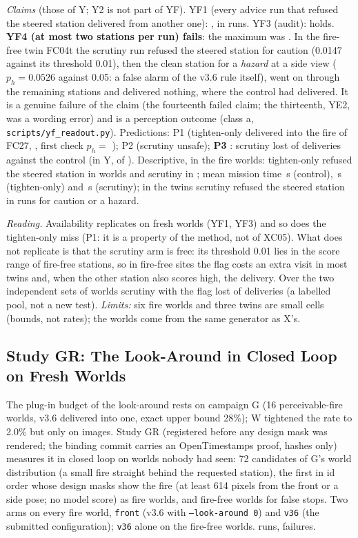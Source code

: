 \documentclass[conference]{IEEEtran}
\begin{document}
\emph{Claims} (those of Y; Y2 is not part of YF). YF1 (every advice run that refused the steered station delivered from another one): \YFOneHolds{}, in \YFOneRefused{} runs. YF3 (audit): holds. \textbf{YF4 (at most two stations per run) fails}: the maximum was \YFMaxVisits. In the fire-free twin FC04t the scrutiny run refused the steered station for caution (0.0147 against its threshold 0.01), then the clean station for a \emph{hazard} at a side view ($p_h=0.0526$ against 0.05: a false alarm of the v3.6 rule itself), went on through the remaining stations and delivered nothing, where the control had delivered. It is a genuine failure of the claim (the fourteenth failed claim; the thirteenth, YE2, was a wording error) and is a perception outcome (class a, \texttt{scripts/yf\_readout.py}). Predictions: P1 \YFPredOne{} (tighten-only delivered into the fire of FC27, \YFUnsafeMono{}, first check $p_h=$ \YFReadMiss{}); P2 \YFPredTwo{} (scrutiny \YFUnsafeScr{} unsafe); \textbf{P3 \YFPredThree{}}: scrutiny lost \YFLostScr{} of \YFPairs{} deliveries against the control (in Y, \YSLostScr{} of \YSPairs). Descriptive, in the fire worlds: tighten-only refused the steered station in \YFRefusedMono{} worlds and scrutiny in \YFRefusedScr{}; mean mission time \YFTimeCtl\,s (control), \YFTimeMono\,s (tighten-only) and \YFTimeScr\,s (scrutiny); in the twins scrutiny refused the steered station in \YFTwinRefusedScr{} runs for caution or a hazard.

\emph{Reading.} Availability replicates on fresh worlds (YF1, YF3) and so does the tighten-only miss (P1: it is a property of the method, not of XC05). What does not replicate is that the scrutiny arm is free: its threshold 0.01 lies in the score range of fire-free stations, so in fire-free sites the flag costs an extra visit in most twins and, when the other station also scores high, the delivery. Over the two independent sets of worlds scrutiny with the flag lost \YPoolLost{} of \YPoolPairs{} deliveries (a labelled pool, not a new test). \emph{Limits:} six fire worlds and three twins are small cells (bounds, not rates); the worlds come from the same generator as X's.

\subsection{Study GR: The Look-Around in Closed Loop on Fresh Worlds}\label{sec:moved-gr}
The plug-in budget of the look-around rests on campaign G (16 perceivable-fire worlds, v3.6 delivered into one, exact upper bound 28\%); W tightened the rate to 2.0\% but only on images. Study GR (registered before any design mask was rendered; the binding commit carries an OpenTimestamps proof, hashes only) measures it in closed loop on worlds nobody had seen: 72 candidates of G's world distribution (a small fire straight behind the requested station), the first \GRWorlds{} in id order whose design masks show the fire (at least 614 pixels from the front or a side pose; no model score) as fire worlds, and \GRPlain{} fire-free worlds for false stops. Two arms on every fire world, \texttt{front} (v3.6 with \texttt{--look-around 0}) and \texttt{v36} (the submitted configuration); \texttt{v36} alone on the fire-free worlds. \GRN{} runs, \GRFailed{} failures.
\end{document}
